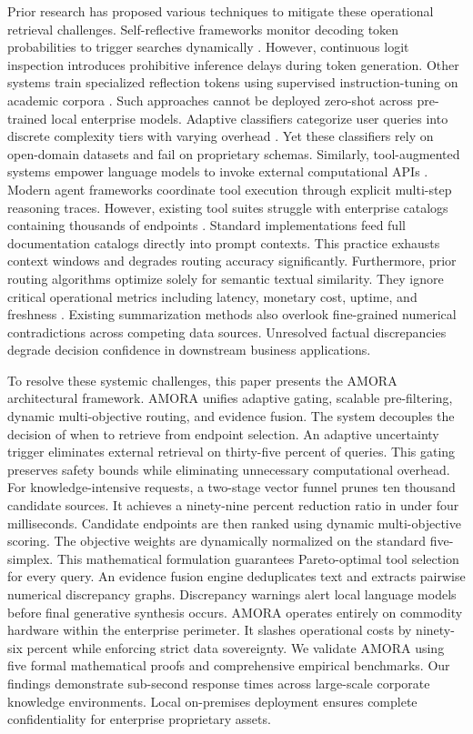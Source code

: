\documentclass[conference,onecolumn,10pt]{IEEEtran}
\begin{document}
Prior research has proposed various techniques to mitigate these operational retrieval challenges. Self-reflective frameworks monitor decoding token probabilities to trigger searches dynamically \cite{jiang2023flare}. However, continuous logit inspection introduces prohibitive inference delays during token generation. Other systems train specialized reflection tokens using supervised instruction-tuning on academic corpora \cite{asai2023selfrag}. Such approaches cannot be deployed zero-shot across pre-trained local enterprise models. Adaptive classifiers categorize user queries into discrete complexity tiers with varying overhead \cite{jeong2024adaptiverag,wang2023skr}. Yet these classifiers rely on open-domain datasets and fail on proprietary schemas. Similarly, tool-augmented systems empower language models to invoke external computational APIs \cite{schick2023toolformer,yao2022react}. Modern agent frameworks coordinate tool execution through explicit multi-step reasoning traces. However, existing tool suites struggle with enterprise catalogs containing thousands of endpoints \cite{patil2023gorilla,qin2023toolllm}. Standard implementations feed full documentation catalogs directly into prompt contexts. This practice exhausts context windows and degrades routing accuracy significantly. Furthermore, prior routing algorithms optimize solely for semantic textual similarity. They ignore critical operational metrics including latency, monetary cost, uptime, and freshness \cite{burges2010lambdamart,zhang2007moea}. Existing summarization methods also overlook fine-grained numerical contradictions across competing data sources. Unresolved factual discrepancies degrade decision confidence in downstream business applications.

To resolve these systemic challenges, this paper presents the AMORA architectural framework. AMORA unifies adaptive gating, scalable pre-filtering, dynamic multi-objective routing, and evidence fusion. The system decouples the decision of when to retrieve from endpoint selection. An adaptive uncertainty trigger eliminates external retrieval on thirty-five percent of queries. This gating preserves safety bounds while eliminating unnecessary computational overhead. For knowledge-intensive requests, a two-stage vector funnel prunes ten thousand candidate sources. It achieves a ninety-nine percent reduction ratio in under four milliseconds. Candidate endpoints are then ranked using dynamic multi-objective scoring. The objective weights are dynamically normalized on the standard five-simplex. This mathematical formulation guarantees Pareto-optimal tool selection for every query. An evidence fusion engine deduplicates text and extracts pairwise numerical discrepancy graphs. Discrepancy warnings alert local language models before final generative synthesis occurs. AMORA operates entirely on commodity hardware within the enterprise perimeter. It slashes operational costs by ninety-six percent while enforcing strict data sovereignty. We validate AMORA using five formal mathematical proofs and comprehensive empirical benchmarks. Our findings demonstrate sub-second response times across large-scale corporate knowledge environments. Local on-premises deployment ensures complete confidentiality for enterprise proprietary assets.
\end{document}
